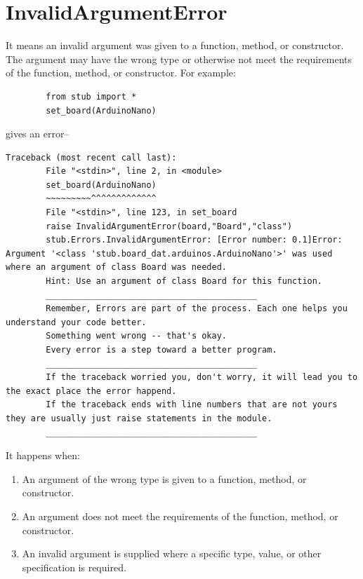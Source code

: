 	\section{InvalidArgumentError} 
	It means an invalid argument was given to a function, method, or constructor. The argument may have the wrong type or otherwise not meet the requirements of the function, method, or constructor. For example: 
	\begin{lstlisting} 
		from stub import * 
		set_board(ArduinoNano) 
	\end{lstlisting} 
	gives an error-- 
	\begin{lstlisting}[style=tracebacks] 
		Traceback (most recent call last): 
		File "<stdin>", line 2, in <module> 
		set_board(ArduinoNano) 
		~~~~~~~~~^^^^^^^^^^^^^ 
		File "<stdin>", line 123, in set_board 
		raise InvalidArgumentError(board,"Board","class") 
		stub.Errors.InvalidArgumentError: [Error number: 0.1]Error: Argument '<class 'stub.board_dat.arduinos.ArduinoNano'>' was used where an argument of class Board was needed. 
		Hint: Use an argument of class Board for this function. 
		__________________________________________ 
		Remember, Errors are part of the process. Each one helps you understand your code better. 
		Something went wrong -- that's okay. 
		Every error is a step toward a better program. 
		__________________________________________ 
		If the traceback worried you, don't worry, it will lead you to the exact place the error happend. 
		If the traceback ends with line numbers that are not yours they are usually just raise statements in the module. 
		__________________________________________ 
	\end{lstlisting} 
	
	It happens when: 
	\begin{enumerate} 
		\item An argument of the wrong type is given to a function, method, or constructor. 
		\item An argument does not meet the requirements of the function, method, or constructor. 
		\item An invalid argument is supplied where a specific type, value, or other specification is required. 
	\end{enumerate} 
	\newpage 
	
